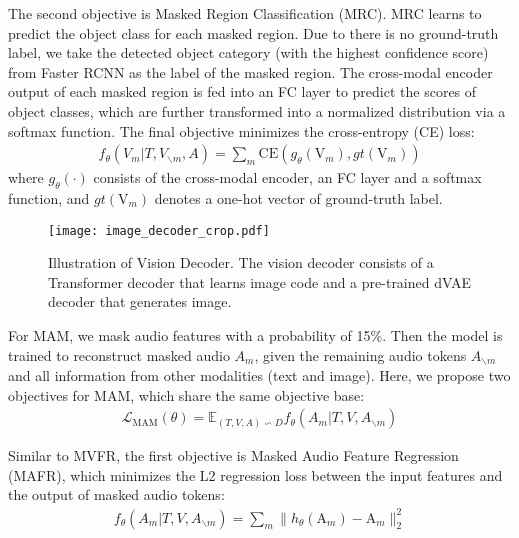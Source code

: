 \documentclass[10pt,twocolumn,letterpaper]{article}
\begin{document}
The second objective is Masked Region Classification (MRC). MRC learns to predict the object class for each masked region. Due to there is no ground-truth label, we take the detected object category (with the highest confidence score) from Faster RCNN as the label of the masked region. The cross-modal encoder output of each masked region is fed into an FC layer to predict the scores of object classes, which are further transformed into a normalized distribution via a softmax function. The final objective minimizes the cross-entropy (CE) loss:
\begin{align}
 f_{\theta}(V_m|T, V_{\backslash m},A) = \sum_m \mathrm{CE}(g_{\theta}(\boldsymbol{\mathrm{V}}_m), gt(\boldsymbol{\mathrm{V}}_m))
\end{align}
where $g_{\theta}(\cdot)$ consists of the cross-modal encoder, an FC layer and a softmax function, and $gt(\boldsymbol{\mathrm{V}}_m)$ denotes a one-hot vector of ground-truth label. \\

\begin{figure}[t]
\begin{center}
\texttt{[image: image\_decoder\_crop.pdf]}
\end{center}
  \caption{Illustration of Vision Decoder. The vision decoder consists of a Transformer decoder that learns image code and a pre-trained dVAE decoder that generates image.}
\label{fig:img_deco}
\end{figure}

 For MAM, we mask audio features with a probability of 15\%. Then the model is trained to reconstruct masked audio $A_m$, given the remaining audio tokens $A_{\backslash m}$ and all information from other modalities (\ie text and image). Here, we propose two objectives for MAM, which share the same objective base:
\begin{align}
\mathcal{L}_{\mathrm{MAM}}(\theta) = \mathbb{E}_{(T,V,A)\backsim D} f_{\theta}(A_m|T, V, A_{\backslash m})
\end{align} 

Similar to MVFR, the first objective is Masked Audio Feature Regression (MAFR), which minimizes the L2 regression loss between the input features and the output of masked audio tokens: 
\begin{align}
f_{\theta}(A_m|T, V, A_{\backslash m}) = \sum_m \| h_{\theta}(\boldsymbol{\mathrm{A}}_m) - \boldsymbol{\mathrm{A}}_m\|^2_2
\end{align}
\end{document}
